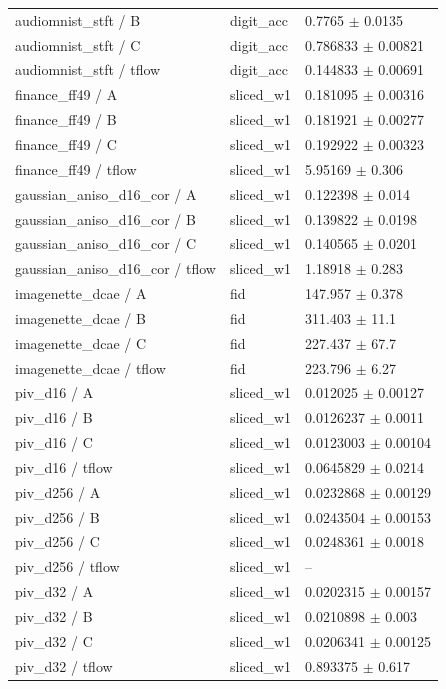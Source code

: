 \begin{tabular}{lll}
audiomnist\_stft / B & digit\_acc & 0.7765 $\pm$ 0.0135 \\
audiomnist\_stft / C & digit\_acc & 0.786833 $\pm$ 0.00821 \\
audiomnist\_stft / tflow & digit\_acc & 0.144833 $\pm$ 0.00691 \\
finance\_ff49 / A & sliced\_w1 & 0.181095 $\pm$ 0.00316 \\
finance\_ff49 / B & sliced\_w1 & 0.181921 $\pm$ 0.00277 \\
finance\_ff49 / C & sliced\_w1 & 0.192922 $\pm$ 0.00323 \\
finance\_ff49 / tflow & sliced\_w1 & 5.95169 $\pm$ 0.306 \\
gaussian\_aniso\_d16\_cor / A & sliced\_w1 & 0.122398 $\pm$ 0.014 \\
gaussian\_aniso\_d16\_cor / B & sliced\_w1 & 0.139822 $\pm$ 0.0198 \\
gaussian\_aniso\_d16\_cor / C & sliced\_w1 & 0.140565 $\pm$ 0.0201 \\
gaussian\_aniso\_d16\_cor / tflow & sliced\_w1 & 1.18918 $\pm$ 0.283 \\
imagenette\_dcae / A & fid & 147.957 $\pm$ 0.378 \\
imagenette\_dcae / B & fid & 311.403 $\pm$ 11.1 \\
imagenette\_dcae / C & fid & 227.437 $\pm$ 67.7 \\
imagenette\_dcae / tflow & fid & 223.796 $\pm$ 6.27 \\
piv\_d16 / A & sliced\_w1 & 0.012025 $\pm$ 0.00127 \\
piv\_d16 / B & sliced\_w1 & 0.0126237 $\pm$ 0.0011 \\
piv\_d16 / C & sliced\_w1 & 0.0123003 $\pm$ 0.00104 \\
piv\_d16 / tflow & sliced\_w1 & 0.0645829 $\pm$ 0.0214 \\
piv\_d256 / A & sliced\_w1 & 0.0232868 $\pm$ 0.00129 \\
piv\_d256 / B & sliced\_w1 & 0.0243504 $\pm$ 0.00153 \\
piv\_d256 / C & sliced\_w1 & 0.0248361 $\pm$ 0.0018 \\
piv\_d256 / tflow & sliced\_w1 & -- \\
piv\_d32 / A & sliced\_w1 & 0.0202315 $\pm$ 0.00157 \\
piv\_d32 / B & sliced\_w1 & 0.0210898 $\pm$ 0.003 \\
piv\_d32 / C & sliced\_w1 & 0.0206341 $\pm$ 0.00125 \\
piv\_d32 / tflow & sliced\_w1 & 0.893375 $\pm$ 0.617 \\

\end{tabular}
